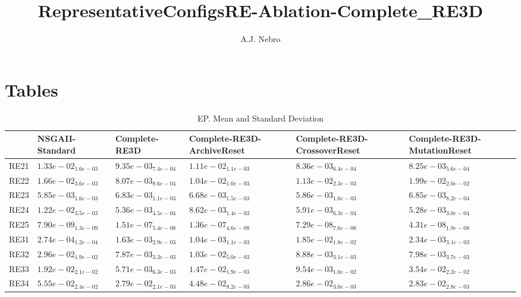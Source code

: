 \documentclass{article}
\title{RepresentativeConfigsRE-Ablation-Complete_RE3D}
\author{A.J. Nebro}
\begin{document}
\maketitle
\section{Tables}

\begin{table}
\caption{EP. Mean and Standard Deviation}
\label{table: EP}
\centering
\begin{scriptsize}
\begin{tabular}{llllll}
\hline & NSGAII-Standard & Complete-RE3D & Complete-RE3D-ArchiveReset & Complete-RE3D-CrossoverReset &  Complete-RE3D-MutationReset\\
\hline 
RE21 & $  1.33e-02_{ 1.6e-03}$ & $  9.35e-03_{ 7.4e-04}$ & $  1.11e-02_{ 1.1e-03}$ & \cellcolor{gray25}$  8.36e-03_{ 6.4e-04}$ & \cellcolor{gray95}$  8.25e-03_{ 5.6e-04}$ \\
RE22 & $  1.66e-02_{ 3.6e-03}$ & \cellcolor{gray95}$  8.07e-03_{ 8.6e-04}$ & \cellcolor{gray25}$  1.04e-02_{ 1.0e-03}$ & $  1.13e-02_{ 2.3e-03}$ & $  1.99e-02_{ 2.0e-02}$ \\
RE23 & \cellcolor{gray95}$  5.85e-03_{ 1.6e-03}$ & $  6.83e-03_{ 1.1e-03}$ & $  6.68e-03_{ 1.5e-03}$ & \cellcolor{gray25}$  5.86e-03_{ 1.6e-03}$ & $  6.85e-03_{ 8.2e-04}$ \\
RE24 & $  1.22e-02_{ 3.5e-03}$ & \cellcolor{gray25}$  5.36e-03_{ 4.5e-04}$ & $  8.62e-03_{ 1.4e-03}$ & $  5.91e-03_{ 6.3e-04}$ & \cellcolor{gray95}$  5.28e-03_{ 3.0e-04}$ \\
RE25 & \cellcolor{gray95}$  7.90e-09_{ 1.3e-09}$ & $  1.51e-07_{ 5.4e-08}$ & $  1.36e-07_{ 4.6e-08}$ & $  7.29e-08_{ 7.6e-08}$ & \cellcolor{gray25}$  4.31e-08_{ 1.9e-08}$ \\
RE31 & \cellcolor{gray95}$  2.74e-04_{ 1.2e-04}$ & $  1.63e-03_{ 2.9e-03}$ & \cellcolor{gray25}$  1.04e-03_{ 1.1e-03}$ & $  1.85e-02_{ 1.8e-02}$ & $  2.34e-03_{ 3.1e-03}$ \\
RE32 & $  2.96e-02_{ 1.9e-02}$ & \cellcolor{gray95}$  7.87e-03_{ 3.3e-03}$ & $  1.03e-02_{ 5.0e-03}$ & $  8.88e-03_{ 3.1e-03}$ & \cellcolor{gray25}$  7.98e-03_{ 3.7e-03}$ \\
RE33 & $  1.92e-02_{ 2.1e-02}$ & \cellcolor{gray95}$  5.71e-03_{ 6.3e-03}$ & $  1.47e-02_{ 1.9e-03}$ & \cellcolor{gray25}$  9.54e-03_{ 1.0e-02}$ & $  3.54e-02_{ 2.2e-02}$ \\
RE34 & $  5.55e-02_{ 2.4e-02}$ & \cellcolor{gray95}$  2.79e-02_{ 2.1e-03}$ & $  4.48e-02_{ 8.2e-03}$ & $  2.86e-02_{ 3.0e-03}$ & \cellcolor{gray25}$  2.83e-02_{ 2.8e-03}$ \\

\end{tabular}
\end{scriptsize}
\end{table}
\end{document}
